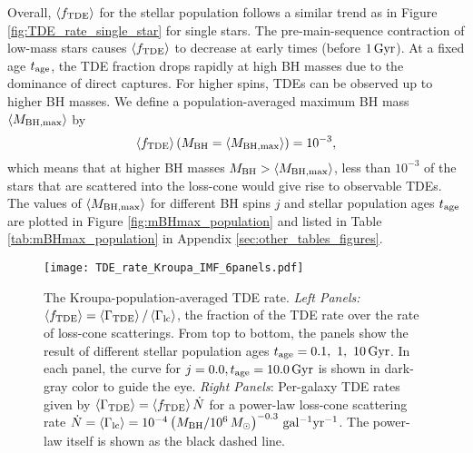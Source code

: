 \documentclass[useAMS,usenatbib]{mn2e}
\def\msun{M_{\rm \odot}}
\def\mBH{M_{\rm BH}}
\def\mBHmax{M_{\rm BH,\max}}
\def\GammaTDE{\Gamma_{\rm TDE}}
\def\Gammalc{\Gamma_{\rm lc}}
\def\fTDE{f_{\rm TDE}}
\def\tage{t_{\rm age}}
\def\Gyr{{\rm Gyr}}
\def\note{\textcolor{magenta}}
\newcommand{\lrb}[1]{\left({#1}\right)}
\newcommand{\lara}[1]{\left\langle{#1}\right\rangle}
\begin{document}
Overall, $\lara{\fTDE}$ for the stellar population follows a similar trend as in Figure \ref{fig:TDE_rate_single_star} for single stars. The pre-main-sequence contraction of low-mass stars causes $\lara{\fTDE}$ to decrease at early times (before $1\,\rm Gyr$). At a fixed age $\tage$, the TDE fraction drops rapidly at high BH masses due to the dominance of direct captures.  For higher spins, TDEs can be observed up to higher BH masses. 
We define a population-averaged maximum BH mass $\lara{\mBHmax}$ by
\begin{equation}
\label{eq:mBHmax_population}
    \lara{\fTDE}(\mBH=\lara{\mBHmax})=10^{-3},
\end{equation}
which means that at higher BH masses $\mBH>\lara{\mBHmax}$, less than $10^{-3}$ of the stars that are scattered into the loss-cone would give rise to observable TDEs. The values of $\lara{\mBHmax}$ for different BH spins $j$ and stellar population ages $\tage$ are plotted in Figure \ref{fig:mBHmax_population} and listed in Table \ref{tab:mBHmax_population}  in Appendix \ref{sec:other_tables_figures}.

\begin{figure*}
    \centering
    \texttt{[image: TDE\_rate\_Kroupa\_IMF\_6panels.pdf]}
    \caption{
    The Kroupa-population-averaged TDE rate.
    \textit{Left Panels:} $\lara{\fTDE}=\lara{\GammaTDE}/\lara{\Gammalc}$, the fraction of the TDE rate over the rate of loss-cone scatterings.
    From top to bottom, the panels show the result of different stellar population ages $\tage=0.1, \ 1, \ 10\rm\, Gyr$.
    In each panel, the curve for $j=0.0,\tage=10.0\,\Gyr$ is shown in dark-gray color to guide the eye.
    \textit{Right Panels}: Per-galaxy TDE rates given by $\lara{\GammaTDE} = \lara{\fTDE} \dot{N}$ for a power-law loss-cone scattering rate $\dot{N} = \lara{\Gammalc}=10^{-4}\lrb{\mBH/10^6\,\msun}^{-0.3}\,\rm gal^{-1}yr^{-1}$. The power-law itself is shown as the black dashed line.
    }
    \label{fig:TDE_rate_Kroupa_IMF}
\end{figure*}
\end{document}
